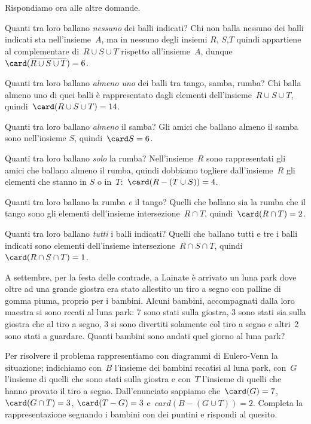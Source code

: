 {\begin{esempio}
Rispondiamo ora alle altre domande.
\begin{enumeratea}
 \item Quanti tra loro ballano \emph{nessuno} dei balli indicati?
Chi non balla nessuno dei balli indicati sta nell'insieme~\(A\), ma in 
nessuno degli insiemi \(R\), \(S\),\(T\) quindi appartiene al complementare
di~\(R\cup S\cup T\) rispetto all'insieme~\(A\),
dunque~\(\card (\overline{{R\cup S\cup T}})=6\).
 \item Quanti tra loro ballano \emph{almeno uno} dei balli tra tango, 
samba, rumba? Chi balla almeno uno di quei balli è rappresentato dagli 
elementi
dell'insieme~\(R\cup S\cup T\), quindi~\(\card(R\cup S\cup T)=14\).
 \item Quanti tra loro ballano \emph{almeno} il samba?
Gli amici che ballano almeno il samba sono nell'insieme
\(S\), quindi~\(\card S=6\).
 \item Quanti tra loro ballano \emph{solo} la rumba? Nell'insieme~\(R\) 
sono rappresentati gli amici che ballano almeno il rumba, quindi dobbiamo 
togliere dall'insieme~\(R\) gli elementi che stanno 
in \(S\) o in~\(T\):~\(\card(R-(T\cup S))=4\).
 \item Quanti tra loro ballano la rumba \emph{e} il tango? 
Quelli che ballano sia la rumba che il tango sono gli elementi
dell'insieme intersezione~\(R\cap T\), quindi~\(\card(R\cap T)=2\).
 \item Quanti tra loro ballano \emph{tutti} i balli indicati? 
Quelli che ballano tutti e tre i balli indicati sono elementi
dell'insieme intersezione~\(R\cap S\cap T\), 
quindi~\(\card(R\cap S\cap T)=1\).
\end{enumeratea}

 \end{esempio}

 \begin{esempio}
 A settembre, per la festa delle contrade, a Lainate è arrivato un luna
park dove oltre ad una grande giostra era stato allestito un tiro a
segno con palline di gomma piuma, proprio per i bambini. Alcuni
bambini, accompagnati dalla loro maestra si sono recati al luna park: 7
sono stati sulla giostra, 3 sono stati sia sulla giostra che al tiro a
segno, 3 si sono divertiti solamente col tiro a segno e altri~2 sono
stati a guardare. Quanti bambini sono andati quel giorno al luna park?

\begin{minipage}{.59 \textwidth}
Per risolvere il problema rappresentiamo con diagrammi di Eulero-Venn la 
situazione; indichiamo con~\(B\) l'insieme dei bambini recatisi al luna 
park, 
con~\(G\) l'insieme di quelli che sono stati sulla giostra e con~\(T\) 
l'insieme
di quelli che hanno provato il tiro a segno.
Dall'enunciato sappiamo 
che~\(\card(G)=7\), \(\card(G\cap T)=3\), \(\card(T-G)=3\) 
e~\(card(B-(G\cup T))=2\).
Completa la rappresentazione segnando i bambini con dei puntini e rispondi 
al quesito.
\end{minipage}
\hfill
\begin{minipage}{.39 \textwidth}
\begin{center}
 
\end{center}
\end{minipage}


\end{esempio}}
